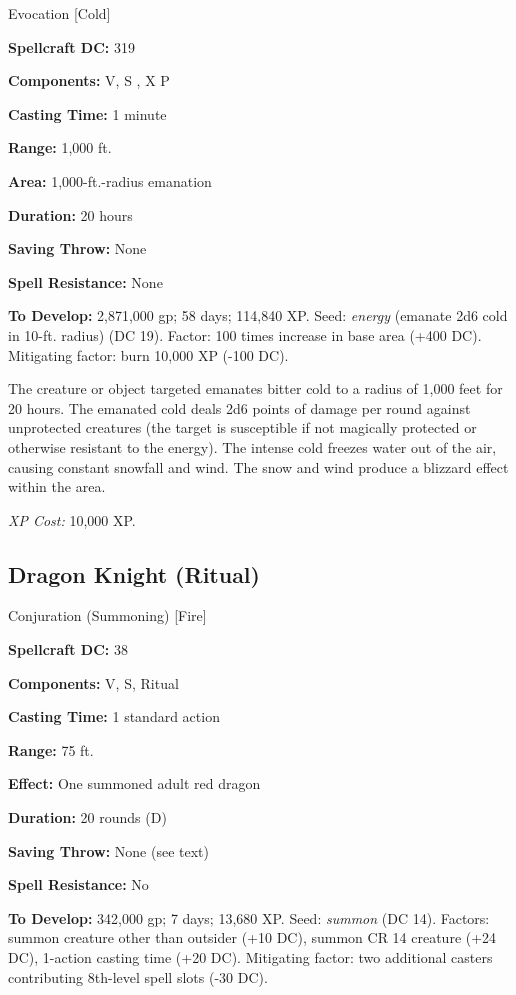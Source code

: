 \documentclass{article}
\begin{document}
Evocation [Cold] 

\textbf{Spellcraft DC:} 319 

\textbf{Components:} V, S , X P 

\textbf{Casting Time:} 1 minute 

\textbf{Range:} 1,000 ft. 

\textbf{Area:} 1,000-ft.-radius emanation 

\textbf{Duration:} 20 hours 

\textbf{Saving Throw:} None 

\textbf{Spell Resistance:} None 

\textbf{To Develop:} 2,871,000 gp; 58 days; 114,840 XP. Seed: \textit{energy }(emanate 
2d6 cold in 10-ft. radius) (DC 19). Factor: 100 times increase in base area (+400 
DC). Mitigating factor: burn 10,000 XP (-100 DC). 

The creature or object targeted emanates bitter cold to a radius of 1,000 feet 
for 20 hours. The emanated cold deals 2d6 points of damage per round against unprotected 
creatures (the target is susceptible if not magically protected or otherwise resistant 
to the energy). The intense cold freezes water out of the air, causing constant 
snowfall and wind. The snow and wind produce a blizzard effect within the area. 

\textit{XP Cost: }10,000 XP. 

\vspace{12pt}
\subsection*{Dragon Knight (Ritual)}

Conjuration (Summoning) [Fire] 

\textbf{Spellcraft DC:} 38 

\textbf{Components:} V, S, Ritual 

\textbf{Casting Time:} 1 standard action 

\textbf{Range:} 75 ft. 

\textbf{Effect:} One summoned adult red dragon 

\textbf{Duration:} 20 rounds (D) 

\textbf{Saving Throw:} None (see text) 

\textbf{Spell Resistance:} No 

\textbf{To Develop:} 342,000 gp; 7 days; 13,680 XP. Seed: \textit{summon }(DC 14). 
Factors: summon creature other than outsider (+10 DC), summon CR 14 creature (+24 
DC), 1-action casting time (+20 DC). Mitigating factor: two additional casters 
contributing 8th-level spell slots (-30 DC). 
\end{document}
